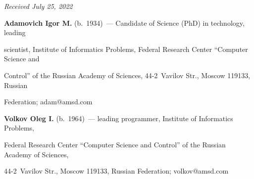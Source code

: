 




\vspace*{-6pt}





\hfill{\small\textit{Received July 25, 2022}} 







  


  \Contr


  


  \noindent


  \textbf{Adamovich Igor M.} (b.\ 1934)~--- Candidate of Science (PhD) in technology, leading 


scientist, Institute of Informatics Problems, Federal Research Center ``Computer Science and 


Control'' of the Russian Academy of Sciences, 44-2~Vavilov Str., Moscow 119133, Russian 


Federation; \mbox{adam@amsd.com}


  


  \vspace*{3pt}


  


  \noindent


  \textbf{Volkov Oleg I.} (b.\ 1964)~--- leading programmer, Institute of Informatics Problems, 


Federal Research Center ``Computer Science and Control'' of the Russian Academy of Sciences, 


44-2~Vavilov Str., Moscow 119133, Russian Federation; \mbox{volkov@amsd.com}


  


  





\label{end\stat}





\renewcommand{\bibname}{\protect\rm Литература} 


  


